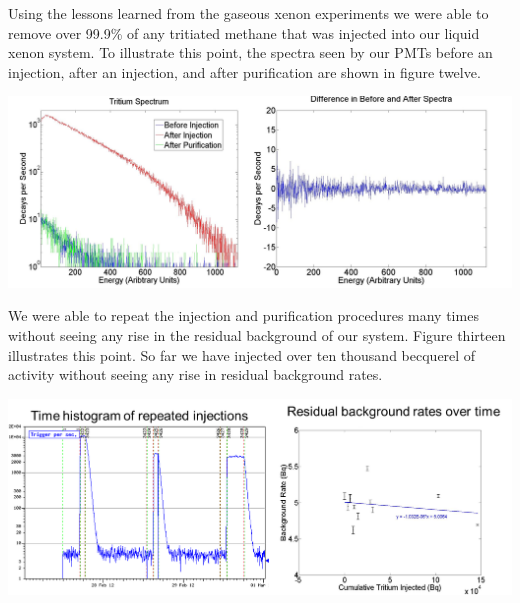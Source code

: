 \documentclass[a4paper,12pt]{article}
\begin{document}
Using the lessons learned from the gaseous xenon experiments we were able to remove over 99.9\% of any tritiated methane that was injected into our liquid xenon system.  To illustrate this point, the spectra seen by our PMTs before an injection, after an injection, and after purification are shown in figure twelve.

\begin{center}
\includegraphics[scale=0.5]{spectra.png}
\end{center}


We were able to repeat the injection and purification procedures many times without seeing any rise in the residual background of our system.  Figure thirteen illustrates this point.  So far we have injected over ten thousand becquerel of activity without seeing any rise in residual background rates.

\begin{center}
\includegraphics[scale=0.5]{backgrounds.png}
\end{center}
\end{document}
